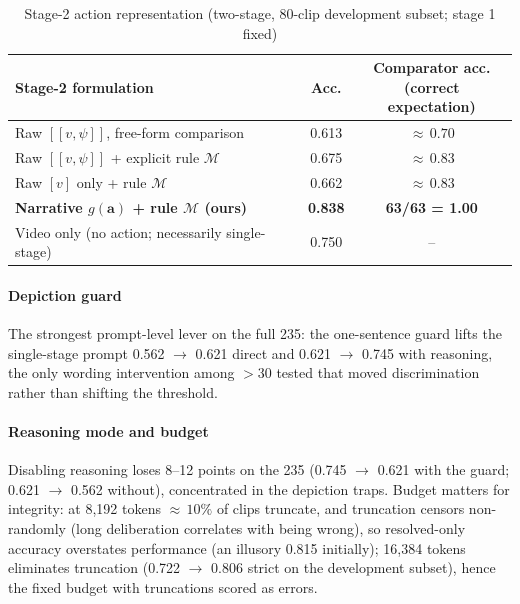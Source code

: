 \documentclass[conference]{IEEEtran}
\newcommand{\act}{\boldsymbol{a}}          %
\newcommand{\Mcal}{\mathcal{M}}            %
\begin{document}
\begin{table}[htbp]
\caption{Stage-2 action representation (two-stage, 80-clip development subset; stage 1 fixed)}
\begin{center}
\footnotesize
\begin{tabular}{|p{3.05cm}|c|c|}
\hline
\textbf{Stage-2 formulation} & \textbf{Acc.} & \parbox[c]{3.05cm}{\centering\textbf{Comparator acc.}\\\textbf{(correct expectation)}\vspace{1pt}} \\
\hline
Raw $[[v, \psi]]$, free-form comparison & 0.613 & ${\approx}\,0.70$ \\
\hline
Raw $[[v, \psi]]$ + explicit rule $\Mcal$ & 0.675 & ${\approx}\,0.83$ \\
\hline
Raw $[v]$ only + rule $\Mcal$ & 0.662 & ${\approx}\,0.83$ \\
\hline
\textbf{Narrative $g(\act)$ + rule $\Mcal$ (ours)} & \textbf{0.838} & \textbf{63/63 = 1.00} \\
\hline
Video only (no action; necessarily single-stage) & 0.750 & -- \\
\hline
\end{tabular}
\label{tab:action}
\end{center}
\end{table}

\paragraph{Depiction guard} The strongest prompt-level lever on the full 235: the one-sentence guard lifts the single-stage prompt 0.562 $\rightarrow$ 0.621 direct and 0.621 $\rightarrow$ 0.745 with reasoning, the only wording intervention among $>30$ tested that moved discrimination rather than shifting the threshold.

\paragraph{Reasoning mode and budget} Disabling reasoning loses 8--12 points on the 235 (0.745 $\rightarrow$ 0.621 with the guard; 0.621 $\rightarrow$ 0.562 without), concentrated in the depiction traps. Budget matters for integrity: at 8{,}192 tokens ${\approx}\,10\%$ of clips truncate, and truncation censors non-randomly (long deliberation correlates with being wrong), so resolved-only accuracy overstates performance (an illusory 0.815 initially); 16{,}384 tokens eliminates truncation (0.722 $\rightarrow$ 0.806 strict on the development subset), hence the fixed budget with truncations scored as errors.
\end{document}
